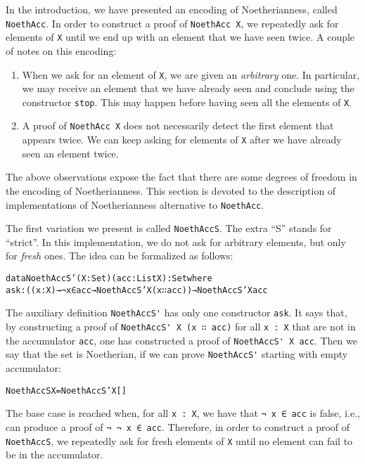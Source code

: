 \documentclass{eptcs}
\begin{document}
In the introduction, we have presented an encoding of Noetherianness,
called \verb+NoethAcc+. In order to construct a proof of
\verb+NoethAcc X+, we repeatedly ask for elements of \verb+X+ until we
end up with an element that we have seen twice. A couple of notes on this
encoding:
\begin{enumerate}
\item When we ask for an element of \verb+X+, we are given an
  \emph{arbitrary} one. In particular, we may receive an element
  that we have already seen and conclude using the constructor
  \verb+stop+. This may happen before having seen all the elements of
  \verb+X+.
\item A proof of \verb+NoethAcc X+ does not necessarily detect the first
  element that appears twice. We can keep asking for elements of
  \verb+X+ after we have already seen an element twice.
\end{enumerate}
The above observations expose the fact that there are some degrees
of freedom in the encoding of Noetherianness. This section is
devoted to the description of implementations of Noetherianness
alternative to \verb+NoethAcc+.

The first variation we present is called \verb+NoethAccS+. The extra ``S''
stands for ``strict''. In this implementation, we do not ask for arbitrary elements,
but only for \emph{fresh} ones. The idea can be formalized as follows:
\begin{alltt}
data NoethAccS' (X : Set) (acc : List X) : Set where
  ask : ((x : X) → ¬ x ∈ acc → NoethAccS' X (x ∷ acc)) → NoethAccS' X acc
\end{alltt}
The auxiliary definition \verb;NoethAccS'; has only one constructor
\verb;ask;. It says that, by constructing a proof of
\verb;NoethAccS' X (x ∷ acc); for all \verb+x : X+ that are not in the
accumulator \verb;acc;, one has constructed a proof of
\verb;NoethAccS' X acc;.  Then we say that the set is Noetherian, if we
can prove \verb;NoethAccS'; starting with empty accumulator:
\begin{alltt}
NoethAccS X = NoethAccS' X []
\end{alltt}
The base case is reached when, for all \verb;x : X;, we have that
\verb;¬ x ∈ acc; is false, i.e., can produce a proof of \verb;¬ ¬ x ∈ acc;.  Therefore, in
order to construct a proof of \verb+NoethAccS+, we repeatedly ask for fresh
elements of \verb;X; until no element can fail to be in the accumulator.
\end{document}
